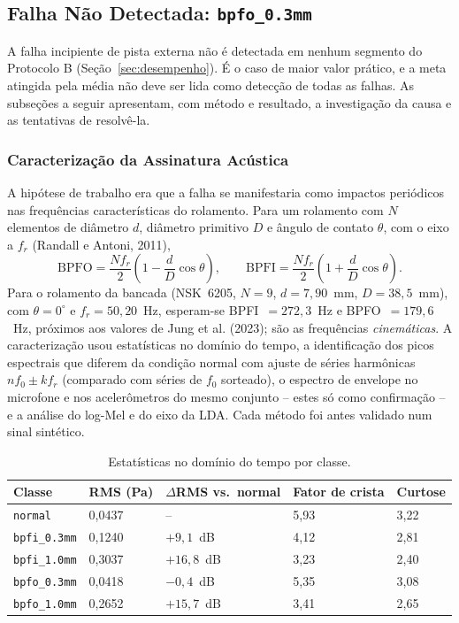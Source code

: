 \documentclass[12pt,a4paper]{article}
\begin{document}
\subsection{Falha Não Detectada: \texttt{bpfo\_0.3mm}}
\label{sec:bpfo}

A falha incipiente de pista externa não é detectada em nenhum segmento do Protocolo B (Seção~\ref{sec:desempenho}). É o caso de maior valor prático, e a meta atingida pela média não deve ser lida como detecção de todas as falhas. As subseções a seguir apresentam, com método e resultado, a investigação da causa e as tentativas de resolvê-la.

\subsubsection{Caracterização da Assinatura Acústica}
\label{sec:bpfo-assinatura}

A hipótese de trabalho era que a falha se manifestaria como impactos periódicos nas frequências características do rolamento. Para um rolamento com $N$ elementos de diâmetro $d$, diâmetro primitivo $D$ e ângulo de contato $\theta$, com o eixo a $f_r$ (Randall e Antoni, 2011),
\begin{equation}
\mathrm{BPFO} = \frac{N f_r}{2}\left(1 - \frac{d}{D}\cos\theta\right), \qquad
\mathrm{BPFI} = \frac{N f_r}{2}\left(1 + \frac{d}{D}\cos\theta\right).
\label{eq:bpf}
\end{equation}
Para o rolamento da bancada (NSK~6205, $N = 9$, $d = 7{,}90$~mm, $D = 38{,}5$~mm), com $\theta = 0^\circ$ e $f_r = 50{,}20$~Hz, esperam-se BPFI~$= 272{,}3$~Hz e BPFO~$= 179{,}6$~Hz, próximos aos valores de Jung et al. (2023); são as frequências \emph{cinemáticas}. A caracterização usou estatísticas no domínio do tempo, a identificação dos picos espectrais que diferem da condição normal com ajuste de séries harmônicas $n f_0 \pm k f_r$ (comparado com séries de $f_0$ sorteado), o espectro de envelope no microfone e nos acelerômetros do mesmo conjunto -- estes só como confirmação -- e a análise do log-Mel e do eixo da LDA. Cada método foi antes validado num sinal sintético.

\begin{table}[H]
\centering
\caption{Estatísticas no domínio do tempo por classe.}
\label{tab:tempo}
\begin{tabularx}{\textwidth}{X C{2.4cm} C{2.8cm} C{2.4cm} C{2.2cm}}
\toprule
\textbf{Classe} & \textbf{RMS (Pa)} & \textbf{$\Delta$RMS vs.\ normal} & \textbf{Fator de crista} & \textbf{Curtose} \\
\midrule
\texttt{normal}      & 0,0437 & --        & 5,93 & 3,22 \\
\texttt{bpfi\_0.3mm} & 0,1240 & $+9{,}1$~dB  & 4,12 & 2,81 \\
\texttt{bpfi\_1.0mm} & 0,3037 & $+16{,}8$~dB & 3,23 & 2,40 \\
\texttt{bpfo\_0.3mm} & 0,0418 & $-0{,}4$~dB  & 5,35 & 3,08 \\
\texttt{bpfo\_1.0mm} & 0,2652 & $+15{,}7$~dB & 3,41 & 2,65 \\
\bottomrule
\end{tabularx}
\end{table}
\end{document}
